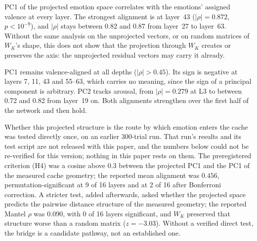 PC1 of the projected emotion space correlates with the emotions' assigned valence at every layer. The strongest alignment is at layer~43 ($|\rho| = 0.872$, $p < 10^{-9}$), and $|\rho|$ stays between 0.82 and 0.87 from layer~27 to layer~63. Without the same analysis on the unprojected vectors, or on random matrices of $W_K$'s shape, this does not show that the projection through $W_K$ creates or preserves the axis: the unprojected residual vectors may carry it already.

PC1 remains valence-aligned at all depths ($|\rho| > 0.45$). Its sign is negative at layers 7, 11, 43 and 55--63, which carries no meaning, since the sign of a principal component is arbitrary. PC2 tracks arousal, from $|\rho| = 0.279$ at L3 to between 0.72 and 0.82 from layer~19 on. Both alignments strengthen over the first half of the network and then hold.

Whether this projected structure is the route by which emotion enters the cache was tested directly once, on an earlier 300-trial run. That run's results and its test script are not released with this paper, and the numbers below could not be re-verified for this version; nothing in this paper rests on them. The preregistered criterion (H4) was a cosine above $0.3$ between the projected PC1 and the PC1 of the measured cache geometry; the reported mean alignment was $0.456$, permutation-significant at 9 of 16 layers and at 2 of 16 after Bonferroni correction. A stricter test, added afterwards, asked whether the projected space predicts the pairwise distance structure of the measured geometry; the reported Mantel $\rho$ was $0.090$, with 0 of 16 layers significant, and $W_K$ preserved that structure worse than a random matrix ($z = -3.03$). Without a verified direct test, the bridge is a candidate pathway, not an established one.

